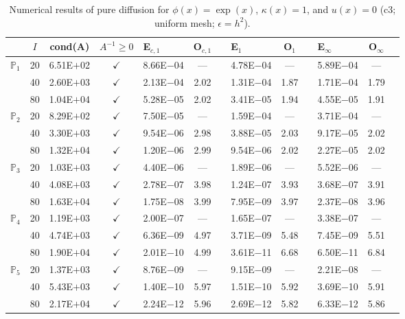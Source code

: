 \begin{table}[H]
\centering
\caption{Numerical results of pure diffusion for $\phi(x)=\exp(x)$, $\kappa(x)=1$, and $u(x)=0$ (c3; uniform mesh; $\epsilon=h^2$).}
\begin{tabular}{@{}l c c c l c c l c c l c c@{}}
\toprule
 & $I$ & cond(A) & $A^{-1}\geq 0$ &  E$_{c,1}$ & O$_{c,1}$ && E$_1$ & O$_1$ && E$_{\infty}$ & O$_{\infty}$\\
\midrule
\multirow{3}{*}{$\mathbb{P}_{1}$}
 & 20 & 6.51E$+$02 & $\checkmark$ & 8.66E$-$04 & --- && 4.78E$-$04 & --- && 5.89E$-$04 & ---\\
 & 40 & 2.60E$+$03 & $\checkmark$ & 2.13E$-$04 & 2.02 && 1.31E$-$04 & 1.87 && 1.71E$-$04 & 1.79\\
 & 80 & 1.04E$+$04 & $\checkmark$ & 5.28E$-$05 & 2.02 && 3.41E$-$05 & 1.94 && 4.55E$-$05 & 1.91\\
\midrule
\multirow{3}{*}{$\mathbb{P}_{2}$}
 & 20 & 8.29E$+$02 & $\checkmark$ & 7.50E$-$05 & --- && 1.59E$-$04 & --- && 3.71E$-$04 & ---\\
 & 40 & 3.30E$+$03 & $\checkmark$ & 9.54E$-$06 & 2.98 && 3.88E$-$05 & 2.03 && 9.17E$-$05 & 2.02\\
 & 80 & 1.32E$+$04 & $\checkmark$ & 1.20E$-$06 & 2.99 && 9.54E$-$06 & 2.02 && 2.27E$-$05 & 2.02\\
\midrule
\multirow{3}{*}{$\mathbb{P}_{3}$}
 & 20 & 1.03E$+$03 & $\checkmark$ & 4.40E$-$06 & --- && 1.89E$-$06 & --- && 5.52E$-$06 & ---\\
 & 40 & 4.08E$+$03 & $\checkmark$ & 2.78E$-$07 & 3.98 && 1.24E$-$07 & 3.93 && 3.68E$-$07 & 3.91\\
 & 80 & 1.63E$+$04 & $\checkmark$ & 1.75E$-$08 & 3.99 && 7.95E$-$09 & 3.97 && 2.37E$-$08 & 3.96\\
\midrule
\multirow{3}{*}{$\mathbb{P}_{4}$}
 & 20 & 1.19E$+$03 & $\checkmark$ & 2.00E$-$07 & --- && 1.65E$-$07 & --- && 3.38E$-$07 & ---\\
 & 40 & 4.74E$+$03 & $\checkmark$ & 6.36E$-$09 & 4.97 && 3.71E$-$09 & 5.48 && 7.45E$-$09 & 5.51\\
 & 80 & 1.90E$+$04 & $\checkmark$ & 2.01E$-$10 & 4.99 && 3.61E$-$11 & 6.68 && 6.50E$-$11 & 6.84\\
\midrule
\multirow{3}{*}{$\mathbb{P}_{5}$}
 & 20 & 1.37E$+$03 & $\checkmark$ & 8.76E$-$09 & --- && 9.15E$-$09 & --- && 2.21E$-$08 & ---\\
 & 40 & 5.43E$+$03 & $\checkmark$ & 1.40E$-$10 & 5.97 && 1.51E$-$10 & 5.92 && 3.69E$-$10 & 5.91\\
 & 80 & 2.17E$+$04 & $\checkmark$ & 2.24E$-$12 & 5.96 && 2.69E$-$12 & 5.82 && 6.33E$-$12 & 5.86\\
\bottomrule
\end{tabular}
\end{table}